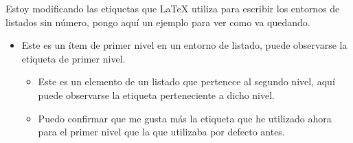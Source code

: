 Estoy modificando las etiquetas que \LaTeX{} utiliza para escribir los
entornos de listados sin número, pongo aquí un ejemplo para ver como va
quedando.

\begin{itemize}
	\item Este es un ítem de primer nivel en un entorno de listado,
		puede observarse la etiqueta de primer nivel.

		\begin{itemize}
			\item Este es un elemento de un listado que
				pertenece al segundo nivel, aquí puede
				observarse la etiqueta perteneciente a
				dicho nivel.
			\item Puedo confirmar que me gusta más la etiqueta
				que he utilizado ahora para el primer nivel
				que la que utilizaba por defecto antes.
		\end{itemize}

\end{itemize}
